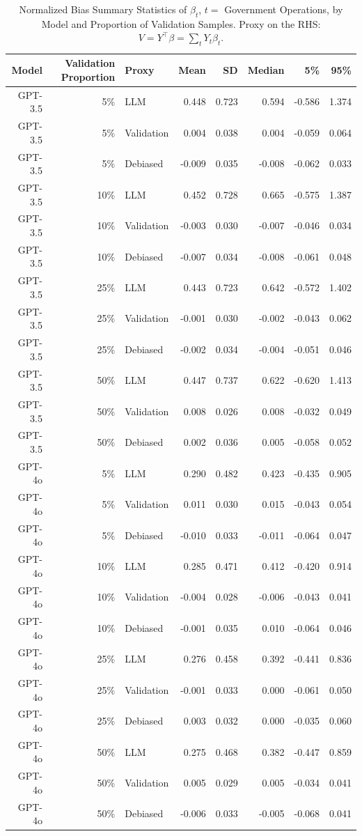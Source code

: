 \begin{table}

\caption{Normalized Bias Summary Statistics of $\beta_{t}$, $t=$ Government Operations, by Model and Proportion of Validation Samples. Proxy on the RHS: $V = Y^\top \beta = \sum_{t} Y_t \beta_t$.}
\centering
\begin{tabular}[t]{rrlrrrrr}
\toprule
Model & Validation Proportion & Proxy & Mean & SD & Median & 5\% & 95\%\\
\midrule
GPT-3.5 & 5\% & LLM & 0.448 & 0.723 & 0.594 & -0.586 & 1.374\\
GPT-3.5 & 5\% & Validation & 0.004 & 0.038 & 0.004 & -0.059 & 0.064\\
GPT-3.5 & 5\% & Debiased & -0.009 & 0.035 & -0.008 & -0.062 & 0.033\\
GPT-3.5 & 10\% & LLM & 0.452 & 0.728 & 0.665 & -0.575 & 1.387\\
GPT-3.5 & 10\% & Validation & -0.003 & 0.030 & -0.007 & -0.046 & 0.034\\
GPT-3.5 & 10\% & Debiased & -0.007 & 0.034 & -0.008 & -0.061 & 0.048\\
GPT-3.5 & 25\% & LLM & 0.443 & 0.723 & 0.642 & -0.572 & 1.402\\
GPT-3.5 & 25\% & Validation & -0.001 & 0.030 & -0.002 & -0.043 & 0.062\\
GPT-3.5 & 25\% & Debiased & -0.002 & 0.034 & -0.004 & -0.051 & 0.046\\
GPT-3.5 & 50\% & LLM & 0.447 & 0.737 & 0.622 & -0.620 & 1.413\\
GPT-3.5 & 50\% & Validation & 0.008 & 0.026 & 0.008 & -0.032 & 0.049\\
GPT-3.5 & 50\% & Debiased & 0.002 & 0.036 & 0.005 & -0.058 & 0.052\\
GPT-4o & 5\% & LLM & 0.290 & 0.482 & 0.423 & -0.435 & 0.905\\
GPT-4o & 5\% & Validation & 0.011 & 0.030 & 0.015 & -0.043 & 0.054\\
GPT-4o & 5\% & Debiased & -0.010 & 0.033 & -0.011 & -0.064 & 0.047\\
GPT-4o & 10\% & LLM & 0.285 & 0.471 & 0.412 & -0.420 & 0.914\\
GPT-4o & 10\% & Validation & -0.004 & 0.028 & -0.006 & -0.043 & 0.041\\
GPT-4o & 10\% & Debiased & -0.001 & 0.035 & 0.010 & -0.064 & 0.046\\
GPT-4o & 25\% & LLM & 0.276 & 0.458 & 0.392 & -0.441 & 0.836\\
GPT-4o & 25\% & Validation & -0.001 & 0.033 & 0.000 & -0.061 & 0.050\\
GPT-4o & 25\% & Debiased & 0.003 & 0.032 & 0.000 & -0.035 & 0.060\\
GPT-4o & 50\% & LLM & 0.275 & 0.468 & 0.382 & -0.447 & 0.859\\
GPT-4o & 50\% & Validation & 0.005 & 0.029 & 0.005 & -0.034 & 0.041\\
GPT-4o & 50\% & Debiased & -0.006 & 0.033 & -0.005 & -0.068 & 0.041\\
\bottomrule
\end{tabular}
\end{table}

